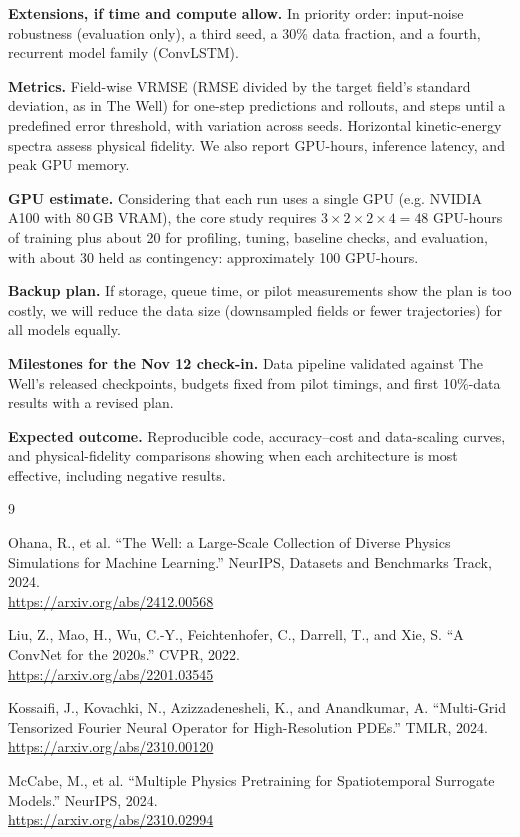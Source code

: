 \documentclass[11pt]{article}
\newcommand{\topic}[1]{\textbf{#1}\enspace}
\begin{document}
\topic{Extensions, if time and compute allow.}
In priority order: input-noise robustness (evaluation only), a third seed, a 30\% data fraction, and a fourth, recurrent model family (ConvLSTM).

\topic{Metrics.}
Field-wise VRMSE (RMSE divided by the target field's standard deviation, as in The Well) for one-step predictions and rollouts, and steps until a predefined error threshold, with variation across seeds. Horizontal kinetic-energy spectra assess physical fidelity. We also report GPU-hours, inference latency, and peak GPU memory.

\topic{GPU estimate.}
Considering that each run uses a single GPU (e.g. NVIDIA A100  with 80\,GB VRAM), the core study requires $3\times2\times2\times4=48$ GPU-hours of training plus about 20 for profiling, tuning, baseline checks, and evaluation, with about 30 held as contingency: approximately 100 GPU-hours.

\topic{Backup plan.}
If storage, queue time, or pilot measurements show the plan is too costly, we will reduce the data size (downsampled fields or fewer trajectories) for all models equally.

\topic{Milestones for the Nov 12 check-in.}
Data pipeline validated against The Well's released checkpoints, budgets fixed from pilot timings, and first 10\%-data results with a revised plan.

\topic{Expected outcome.}
Reproducible code, accuracy--cost and data-scaling curves, and physical-fidelity comparisons showing when each architecture is most effective, including negative results.

\newpage

\begin{thebibliography}{9}
\setlength{\itemsep}{8pt}

Ohana, R., et al.
``The Well: a Large-Scale Collection of Diverse Physics
Simulations for Machine Learning.''
NeurIPS, Datasets and Benchmarks Track, 2024.\\
\url{https://arxiv.org/abs/2412.00568}

Liu, Z., Mao, H., Wu, C.-Y., Feichtenhofer, C., Darrell, T.,
and Xie, S.
``A ConvNet for the 2020s.''
CVPR, 2022.\\
\url{https://arxiv.org/abs/2201.03545}

Kossaifi, J., Kovachki, N., Azizzadenesheli, K.,
and Anandkumar, A.
``Multi-Grid Tensorized Fourier Neural Operator for
High-Resolution PDEs.''
TMLR, 2024.\\
\url{https://arxiv.org/abs/2310.00120}

McCabe, M., et al.
``Multiple Physics Pretraining for Spatiotemporal
Surrogate Models.''
NeurIPS, 2024.\\
\url{https://arxiv.org/abs/2310.02994}

\end{thebibliography}
\end{document}
